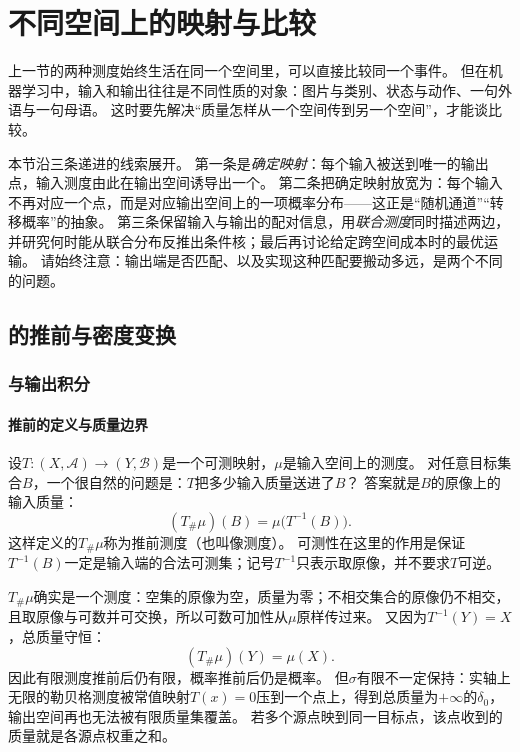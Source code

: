 \section{不同空间上的映射与比较}
\label{sec:measure-cross-space}

上一节的两种测度始终生活在同一个空间里，可以直接比较同一个事件。
但在机器学习中，输入和输出往往是不同性质的对象：图片与类别、状态与动作、一句外语与一句母语。
这时要先解决“质量怎样从一个空间传到另一个空间”，才能谈比较。

本节沿三条递进的线索展开。
第一条是\emph{确定映射}：每个输入被送到唯一的输出点，输入测度由此在输出空间诱导出一个。
第二条把确定映射放宽为：每个输入不再对应一个点，而是对应输出空间上的一项概率分布——这正是“随机通道”“转移概率”的抽象。
第三条保留输入与输出的配对信息，用\emph{联合测度}同时描述两边，并研究何时能从联合分布反推出条件核；最后再讨论给定跨空间成本时的最优运输。
请始终注意：输出端是否匹配、以及实现这种匹配要搬动多远，是两个不同的问题。

\subsection{的推前与密度变换}

\subsubsection{与输出积分}

\paragraph{推前的定义与质量边界}

设$T:(X,\mathcal A)\to(Y,\mathcal B)$是一个可测映射，$\mu$是输入空间上的测度。
对任意目标集合$B$，一个很自然的问题是：$T$把多少输入质量送进了$B$？
答案就是$B$的原像上的输入质量：
\[
 (T_\#\mu)(B)=\mu\bigl(T^{-1}(B)\bigr).
\]
这样定义的$T_\#\mu$称为推前测度（也叫像测度）。
可测性在这里的作用是保证$T^{-1}(B)$一定是输入端的合法可测集；记号$T^{-1}$只表示取原像，并不要求$T$可逆。

$T_\#\mu$确实是一个测度：空集的原像为空，质量为零；不相交集合的原像仍不相交，且取原像与可数并可交换，所以可数可加性从$\mu$原样传过来。
又因为$T^{-1}(Y)=X$，总质量守恒：
\[
 (T_\#\mu)(Y)=\mu(X).
\]
因此有限测度推前后仍有限，概率推前后仍是概率。
但$\sigma$有限不一定保持：实轴上无限的勒贝格测度被常值映射$T(x)=0$压到一个点上，得到总质量为$+\infty$的$\delta_0$，输出空间再也无法被有限质量集覆盖。
若多个源点映到同一目标点，该点收到的质量就是各源点权重之和。


